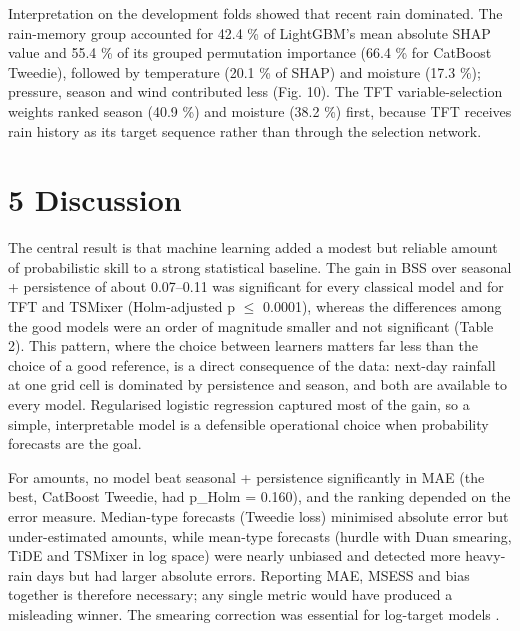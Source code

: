 \documentclass[
]{article}
\begin{document}
Interpretation on the development folds showed that recent rain dominated. The rain-memory group accounted for 42.4 \% of LightGBM's mean absolute SHAP value and 55.4 \% of its grouped permutation importance (66.4 \% for CatBoost Tweedie), followed by temperature (20.1 \% of SHAP) and moisture (17.3 \%); pressure, season and wind contributed less (Fig. 10).  %
The TFT variable-selection weights ranked season (40.9 \%) and moisture (38.2 \%) first, because TFT receives rain history as its target sequence rather than through the selection network.  %

\hypertarget{discussion}{%
\section{5 Discussion}\label{discussion}}

The central result is that machine learning added a modest but reliable amount of probabilistic skill to a strong statistical baseline. The gain in BSS over seasonal + persistence of about 0.07--0.11 was significant for every classical model and for TFT and TSMixer (Holm-adjusted p $\le$ 0.0001), whereas the differences among the good models were an order of magnitude smaller and not significant (Table 2).  %
This pattern, where the choice between learners matters far less than the choice of a good reference, is a direct consequence of the data: next-day rainfall at one grid cell is dominated by persistence and season, and both are available to every model. Regularised logistic regression captured most of the gain, so a simple, interpretable model is a defensible operational choice when probability forecasts are the goal.

For amounts, no model beat seasonal + persistence significantly in MAE (the best, CatBoost Tweedie, had p\_Holm = 0.160), and the ranking depended on the error measure.  %
Median-type forecasts (Tweedie loss) minimised absolute error but under-estimated amounts, while mean-type forecasts (hurdle with Duan smearing, TiDE and TSMixer in log space) were nearly unbiased and detected more heavy-rain days but had larger absolute errors. Reporting MAE, MSESS and bias together is therefore necessary; any single metric would have produced a misleading winner. The smearing correction was essential for log-target models \citep{duan1983}.
\end{document}
